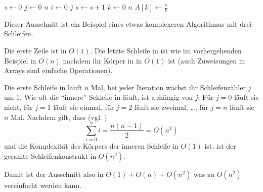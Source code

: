 \begin{codebox}
    \li $s \gets 0$                     \label{ln:ex3-setup}
    \li \For $j \gets 0$ \To $n$        \label{ln:ex3-outer-for}
    \li     \Do
                \For $i \gets 0$ \To $j$\label{ln:ex3-inner-for}
    \li             \Do
                        $s \gets s + 1$ \label{ln:ex3-inner-for-body}
                    \End
            \End
    \li \For $k \gets 0$ \To $n$        \label{ln:ex3-second-for}
    \li     \Do
                $A[k] \gets \frac{s}{k}$\label{ln:ex3-second-for-body}
            \End
\end{codebox}

Dieser Ausschnitt ist ein Beispiel eines etwas komplexeren Algorithmus mit drei-\For Schleifen.

Die erste Zeile ist in $O(1)$. Die letzte Schleife in  ist wie im vorhergehenden Beispiel in $O(n)$ nachdem ihr Körper in  in $O(1)$ ist (auch Zuweisungen in Arrays sind einfache Operationen).

Die erste Schleife in  läuft $n$ Mal, bei jeder Iteration wächst ihr Schleifenzähler $j$ um 1. Wie oft die \enquote{innere} Schleife in  läuft, ist abhängig von $j$: Für $j = 0$ läuft sie nicht, für $j = 1$ läuft sie einmal, für $j = 2$ läuft sie zweimal, \ldots, für $j = n$ läuft sie $n$ Mal. Nachdem gilt, dass (vgl. \cite{cf2007})
\begin{equation*}
    \sum_{i = 0}^{n} i = \frac{n(n - 1)}{2} = O(n^2)
\end{equation*}
und die Komplexität des Körpers der inneren Schleife in $O(1)$ ist, ist der gesamte Schleifenkonstrukt in $O(n^2)$.

Damit ist der Ausschnitt also in $O(1) + O(n) + O(n^2)$ was zu $O(n^2)$ vereinfacht werden kann.

